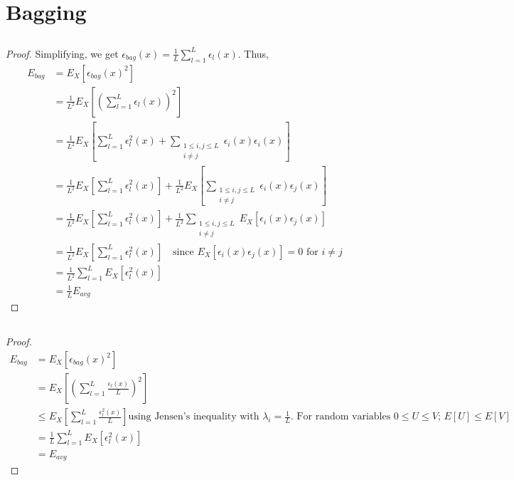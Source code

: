 \documentclass{article}
\begin{document}
\section{Bagging}
\subsection{}
\begin{proof}
	
Simplifying, we get $\epsilon_{bag}(x) = \frac{1}{L}\sum\limits_{l=1}^L \epsilon_l(x)$. Thus,
\begin{equation}
  \label{eq:1.2}
  \begin{split}
	  E_{bag} &= E_X\left[\epsilon_{bag}(x)^2\right] \\
	          &= \frac{1}{L^2}E_X\left[\left(\sum_{l=1}^L \epsilon_l(x)\right)^2\right] \\
			  &= \frac{1}{L^2}E_X\left[\sum_{l=1}^L \epsilon_l^2(x) + \sum_{\substack{1\leq i,j\leq L \\ i \neq j}}\epsilon_i(x)\epsilon_i(x) \right] \\
			  &= \frac{1}{L^2}E_X\left[\sum_{l=1}^L \epsilon_l^2(x)\right]+ \frac{1}{L^2}E_X\left[\sum_{\substack{1\leq i,j\leq L \\ i \neq j}}\epsilon_i(x)\epsilon_j(x) \right] \\
			  &= \frac{1}{L^2}E_X\left[\sum_{l=1}^L \epsilon_l^2(x)\right]+ \frac{1}{L^2}\sum_{\substack{1\leq i,j\leq L \\ i \neq j}}E_X\left[\epsilon_i(x)\epsilon_j(x) \right] \\
			  &= \frac{1}{L^2}E_X\left[\sum_{l=1}^L \epsilon_l^2(x)\right] \quad \text{since $E_X\left[\epsilon_i(x)\epsilon_j(x)\right]=0$ for $i \neq j$} \\
			  &= \frac{1}{L^2} \sum_{l=1}^L E_X\left[ \epsilon_l^2(x)\right] \\
			  &= \frac{1}{L}E_{avg}
  \end{split}
\end{equation}
\end{proof}


\subsection{}
\begin{proof}
\begin{equation}
  \label{eq:1.3}
  \begin{split}
	  E_{bag} &= E_X\left[\epsilon_{bag}(x)^2\right] \\
	          &= E_X\left[\left(\sum_{l=1}^L \frac{\epsilon_l(x)}{L}\right)^2\right] \\
			  &\leq E_X\left[\sum_{l=1}^L \frac{\epsilon_l^2(x)}{L}\right] \text{using Jensen's inequality with $\lambda_i = \frac{1}{L}$. For random variables $0\leq U\leq V$; $E[U] \leq E[V]$ } \\
			  &= \frac{1}{L}\sum_{l=1}^L E_X\left[ \epsilon_l^2(x)\right] \\
			  &= E_{avg}
  \end{split}
\end{equation}
\end{proof}
\end{document}
